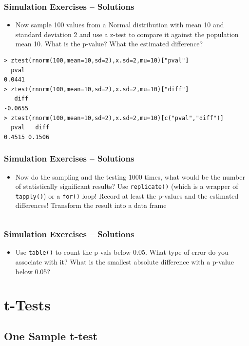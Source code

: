 \documentclass[xcolor={table}]{beamer}
\begin{document}
\begin{frame}\frametitle{Simulation Exercises -- Solutions} 
  \begin{itemize}
  \item Now sample 100 values from a Normal distribution with mean 10 and standard deviation 2 and use a z-test to compare it against the population mean 10. What is the p-value? What the estimated difference?
  \end{itemize}
\begin{verbatim}
> ztest(rnorm(100,mean=10,sd=2),x.sd=2,mu=10)["pval"]
  pval 
0.0441   
> ztest(rnorm(100,mean=10,sd=2),x.sd=2,mu=10)["diff"]
   diff 
-0.0655 
> ztest(rnorm(100,mean=10,sd=2),x.sd=2,mu=10)[c("pval","diff")]
  pval   diff 
0.4515 0.1506 
\end{verbatim}
\end{frame}


\begin{frame}\frametitle{Simulation Exercises -- Solutions} 
  \begin{itemize}
  \item Now do the sampling and the testing 1000 times, what would be the number of statistically significant results? Use \texttt{replicate()} (which is a wrapper of \texttt{tapply()}) or a \texttt{for()} loop! Record at least the p-values and the estimated differences! Transform the result into a data frame
  \end{itemize}
\begin{verbatim}

\end{verbatim}
\end{frame}

\begin{frame}\frametitle{Simulation Exercises -- Solutions} 
\begin{itemize}
\item Use \texttt{table()} to count the p-vals below 0.05. What type of error do you associate with it? What is the smallest absolute difference with a p-value below 0.05?
\end{itemize}
\end{frame}


\section{t-Tests}
\subsection{One Sample t-test}
\end{document}
